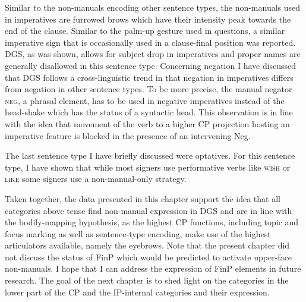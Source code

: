 Similar to the non-manuals encoding other sentence types, the non-manuals used in imperatives are furrowed brows which have their intensity peak towards the end of the clause. Similar to the palm-up gesture used in questions, a similar imperative sign that is occasionally used in a clause-final position was reported. DGS, as was shown, allows for subject drop in imperatives and proper names are generally disallowed in this sentence type. Concerning negation I have discussed that DGS follows a cross-linguistic trend in that negation in imperatives differs from negation in other sentence types. To be more precise, the manual negator \textsc{neg}, a phrasal element, has to be used in negative imperatives instead of the head-shake which has the status of a syntactic head. This observation is in line with the idea that movement of the verb to a higher CP projection hosting an imperative feature is blocked in the presence of an intervening Neg\textdegree .

The last sentence type I have briefly discussed were optatives. For this sentence type, I have shown that while most signers use performative verbs like \textsc{wish} or \textsc{like} some signers use a non-manual-only strategy. 

Taken together, the data presented in this chapter support the idea that all categories above tense find non-manual expression in DGS and are in line with the bodily-mapping hypothesis, as the highest CP functions, including topic and focus marking as well as sentence-type encoding, make use of the highest articulators available, namely the eyebrows. Note that the present chapter did not discuss the status of FinP which would be predicted to activate upper-face non-manuals. I hope that I can address the expression of FinP elements in future research. The goal of the next chapter is to shed light on the categories in the lower part of the CP and the IP-internal categories and their expression.
